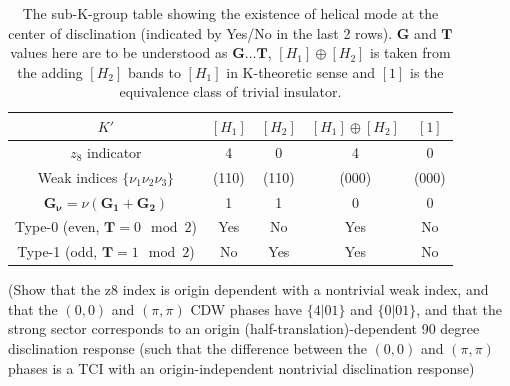 \begin{table}[h]
\begin{tabular}{c|cccc}
$K'$  & $[ H_1 ]$ & $[ H_2 ]$ & $[ H_1 ] \oplus [ H_2 ]$ & $[ 1 ]$  \\
\hline 
$z_8$ indicator &  4 & 0 & 4 & 0 \\
Weak indices $\{ \nu_1 \nu_2 \nu_3 \}$ & (110) & (110) & (000) & (000) \\
$\mathbf{G_{\nu}} = \nu (\mathbf{G_1} + \mathbf{G_2})$ & 1 & 1 & 0 & 0 \\
Type-0 (even, $\mathbf{T} = 0 \mod 2$) & Yes & No & Yes & No \\
Type-1 (odd, $\mathbf{T} = 1 \mod 2$)& No & Yes & Yes & No \\
\end{tabular}
\caption{The sub-K-group table showing the existence of helical mode at the center of disclination (indicated by Yes/No in the last 2 rows). $\mathbf{G}$ and $\mathbf{T}$ values here are to be understood as $\mathbf{G} \dots \mathbf{T}$, $[ H_1 ] \oplus [ H_2 ]$ is taken from the adding $[ H_2 ]$ bands to $[ H_1 ]$ in K-theoretic sense and $[ 1 ]$ is the equivalence class of trivial insulator.} \label{sub-K-group}
\end{table}


{\color{red}(Show that the z8 index is origin dependent with a nontrivial weak index, and that the $(0,0)$ and $(\pi , \pi)$ CDW phases have $\{ 4|01 \}$ and $\{ 0|01 \}$, and that the strong sector corresponds to an origin (half-translation)-dependent 90 degree disclination response (such that the difference between the $(0,0)$ and $(\pi , \pi)$ phases is a TCI with an origin-independent nontrivial disclination response)}


